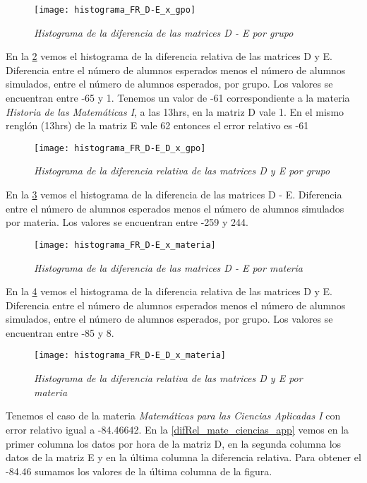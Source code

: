\begin{figure}[H]
\centering
\texttt{[image: histograma\_FR\_D-E\_x\_gpo]} %
\caption{\textit{Histograma de la diferencia de las matrices D - E por grupo}}\label{dif_D_E_gpo}
\end{figure}


En la \figurename{\ref{difRel_D_E_gpo}} vemos el histograma de la diferencia relativa de las matrices D y E. Diferencia entre el número de alumnos esperados menos el número de alumnos simulados, entre el número de alumnos esperados, por grupo. Los valores se encuentran entre -65 y 1. Tenemos un valor de -61 correspondiente a la materia \textit{Historia de las Matemáticas I}, a las 13hrs, en la matriz D vale 1. En el mismo renglón (13hrs) de la matriz E vale 62 entonces el error relativo es -61

\begin{figure}[H]
\centering
\texttt{[image: histograma\_FR\_D-E\_D\_x\_gpo]} %
\caption{\textit{Histograma de la diferencia relativa de las matrices D y E por grupo}}\label{difRel_D_E_gpo}
\end{figure}


En la \figurename{\ref{dif_D_E_materia}} vemos el histograma de la diferencia de las matrices D - E. Diferencia entre el número de alumnos esperados menos el número de alumnos simulados por materia. Los valores se encuentran entre -259 y 244.

\begin{figure}[H]
\centering
\texttt{[image: histograma\_FR\_D-E\_x\_materia]} %
\caption{\textit{Histograma de la diferencia de las matrices D - E por materia}}\label{dif_D_E_materia}
\end{figure}


En la \figurename{\ref{difRel_D_E_materia}} vemos el histograma de la diferencia relativa de las matrices D y E. Diferencia entre el número de alumnos esperados menos el número de alumnos simulados, entre el número de alumnos esperados, por grupo. Los valores se encuentran entre -85 y 8.

\begin{figure}[H]
\centering
\texttt{[image: histograma\_FR\_D-E\_D\_x\_materia]} %
\caption{\textit{Histograma de la diferencia relativa de las matrices D y E por materia}}\label{difRel_D_E_materia}
\end{figure}

Tenemos el caso de la materia \textit{Matemáticas para las Ciencias Aplicadas I} con error relativo igual a -84.46642. En la \figurename{\ref{difRel_mate_ciencias_app}} vemos en la primer columna los datos por hora de la matriz D, en la segunda columna los datos de la matriz E y en la última columna la diferencia relativa. Para obtener el -84.46 sumamos los valores de la última columna de la figura.

